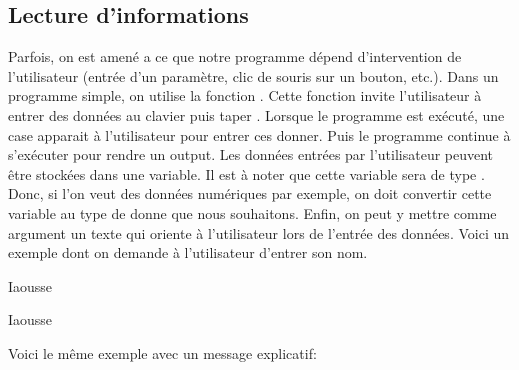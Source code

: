 \documentclass[letterpaper,10pt,french]{sphinxmanual}
\begin{document}
\subsection{Lecture d’informations}
\label{\detokenize{ch1:lecture-d-informations}}
\sphinxAtStartPar
Parfois, on est amené a ce que notre programme dépend d’intervention de l’utilisateur (entrée d’un paramètre, clic de souris sur un bouton, etc.). Dans un programme simple, on utilise la fonction . Cette fonction invite l’utilisateur à entrer des données au clavier puis taper . Lorsque le programme est exécuté, une case apparait à l’utilisateur pour entrer ces donner. Puis le programme continue à s’exécuter pour rendre un output. Les données entrées par l’utilisateur peuvent être stockées dans une variable. Il est à noter que cette variable sera de type . Donc, si l’on veut des données numériques par exemple, on doit convertir cette variable au type de donne que nous souhaitons. Enfin, on peut y mettre comme argument un texte qui oriente à l’utilisateur lors de l’entrée des données.
Voici un exemple dont on demande à l’utilisateur d’entrer son nom.

\begin{sphinxVerbatim}[commandchars=\\\{\}]
  
\end{sphinxVerbatim}

\begin{sphinxVerbatim}[commandchars=\\\{\}]
 Iaousse
\end{sphinxVerbatim}

\begin{sphinxVerbatim}[commandchars=\\\{\}]
Iaousse
\end{sphinxVerbatim}

\sphinxAtStartPar
Voici le même exemple avec un message explicatif:

\begin{sphinxVerbatim}[commandchars=\\\{\}]
  
\end{sphinxVerbatim}
\end{document}
